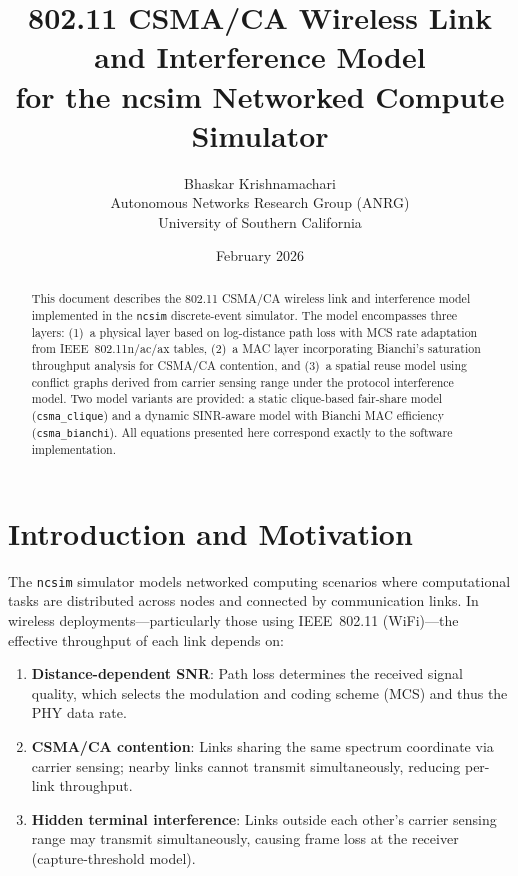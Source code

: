 \documentclass[11pt,letterpaper]{article}
\title{802.11 CSMA/CA Wireless Link and Interference Model\\for the ncsim Networked Compute Simulator}
\author{Bhaskar Krishnamachari\\
Autonomous Networks Research Group (ANRG)\\
University of Southern California}
\date{February 2026}
\newcommand{\ncsim}{\texttt{ncsim}}
\begin{document}
\maketitle

\begin{abstract}
This document describes the 802.11 CSMA/CA wireless link and interference
model implemented in the \ncsim{} discrete-event simulator.  The model
encompasses three layers: (1)~a physical layer based on log-distance path loss
with MCS rate adaptation from IEEE~802.11n/ac/ax tables, (2)~a MAC layer
incorporating Bianchi's saturation throughput analysis for CSMA/CA contention,
and (3)~a spatial reuse model using conflict graphs derived from carrier
sensing range under the protocol interference model.  Two model variants are
provided: a static clique-based fair-share model (\texttt{csma\_clique}) and a
dynamic SINR-aware model with Bianchi MAC efficiency
(\texttt{csma\_bianchi}).  All equations presented here correspond exactly to
the software implementation.
\end{abstract}

\tableofcontents
\newpage

\section{Introduction and Motivation}
\label{sec:intro}

The \ncsim{} simulator models networked computing scenarios where computational
tasks are distributed across nodes and connected by communication links.  In
wireless deployments---particularly those using IEEE~802.11 (WiFi)---the
effective throughput of each link depends on:

\begin{enumerate}[itemsep=2pt]
\item \textbf{Distance-dependent SNR}: Path loss determines the received
  signal quality, which selects the modulation and coding scheme (MCS) and
  thus the PHY data rate.
\item \textbf{CSMA/CA contention}: Links sharing the same spectrum coordinate
  via carrier sensing; nearby links cannot transmit simultaneously, reducing
  per-link throughput.
\item \textbf{Hidden terminal interference}: Links outside each other's
  carrier sensing range may transmit simultaneously, causing frame loss
  at the receiver (capture-threshold model).
\end{enumerate}
\end{document}
